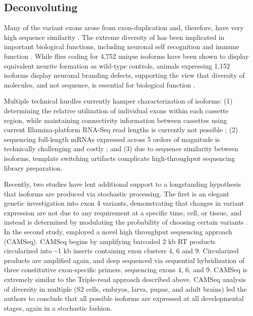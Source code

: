 	\subsection{Deconvoluting \dscam{}}

		Many of the \dscam{} variant exons arose from exon-duplication and, therefore, have very high sequence similarity \citep{Lee2010b}. The extreme diversity of \dscam{} has been implicated in important biological functions, including neuronal self recognition and immune function \citep{Wojtowicz2004,LawrenceZipursky2013,Watson2005}. While flies coding for 4,752 unique isoforms have been shown to display equivalent neurite formation as wild-type controls, animals expressing 1,152 isoforms display neuronal branding defects, supporting the view that diversity of molecules, and not sequence, is essential for biological function \citep{Hattori2009}.

		Multiple technical hurdles currently hamper characterization of \dscam{} isoforms: (1) determining the relative utilization of individual exons within each cassette region, while maintaining connectivity information between cassettes using current Illumina-platform RNA-Seq read lengths is currently not possible \citep{Neves2004,LawrenceZipursky2013,LeGault2013}; (2) sequencing full-length mRNAs expressed across 5 orders of magnitude is technically challenging and costly \citep{Hattori2008,Sharon2013}; and (3) due to sequence similarity between \dscam{} isoforms, template switching artifacts complicate high-throughput sequencing library preparation.

		Recently, two studies have lent additional support to a longstanding hypothesis that \dscam{} isoforms are produced via stochastic processing. The first is an elegant genetic investigation into exon 4 variants, demonstrating that changes in variant expression are not due to any requirement at a specific time, cell, or tissue, and instead is determined by modulating the probability of choosing certain variants \citep{Miura2013b}. In the second study, \citet{Sun2013} employed a novel high throughput sequencing approach (CAMSeq). CAMSeq begins by amplifying barcoded 2 kb \dscam{} RT products circularized into \textasciitilde 1 kb inserts containing exon clusters 4, 6 and 9. Circularized products are amplified again, and deep sequenced via sequential hybridization of three constitutive exon-specific primers, sequencing exons 4, 6, and 9. CAMSeq is extremely similar to the Triple-read approach described above. CAMSeq analysis of \dscam{} diversity in multiple \flies{} (S2 cells, embryos, larva, pupae, and adult brains) led the authors to conclude that all possible isoforms are expressed at all developmental stages, again in a stochastic fashion.

